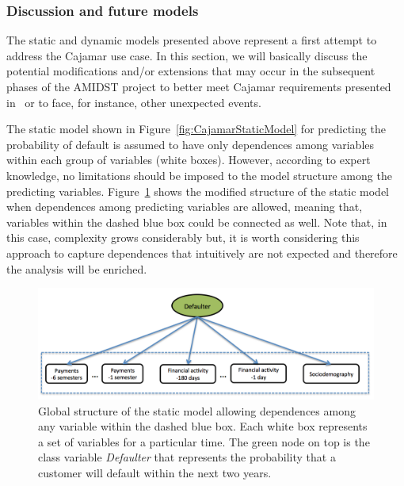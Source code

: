 \subsubsection{Discussion and future models}\label{subsubsec:discussion}

The static and dynamic models presented above represent a first attempt to address the Cajamar use case. In this section, we will basically discuss the potential modifications and/or extensions that may occur in the subsequent phases of the AMIDST project to better meet Cajamar requirements presented in~\cite{Fer14b} or to face, for instance, other unexpected events.

The static model shown in Figure~\ref{fig:CajamarStaticModel} for predicting the probability of default is assumed to have only dependences among variables within each group of variables (white boxes). However, according to expert knowledge, no limitations should be imposed to the model structure among the predicting variables. Figure~\ref{fig:staticDependences} shows the modified structure of the static model when dependences among predicting variables are allowed, meaning that, variables within the dashed blue box could be connected as well. Note that, in this case, complexity grows considerably but, it is worth considering this approach to capture dependences that intuitively are not expected and therefore the analysis will be enriched.

\begin{figure}[ht!]
  \centering
\includegraphics[scale=0.35]{./figures/CajaMarModel3}
\caption{\label{fig:staticDependences}Global structure of the static model allowing dependences among any variable within the dashed blue box. Each white box represents a set of variables for a particular time. The green node on top is the class variable \emph{Defaulter} that represents the probability that a customer will default within the next two years.} 
\end{figure}

